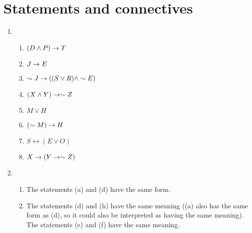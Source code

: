 \section{Statements and connectives}

\solutions{}

\begin{enumerate}
  \item %
    \begin{enumerate}[(\alph*)]
      \item \((D \wedge P) \rightarrow T\)
      \item \(J \rightarrow E\)
      \item \(\sim J \rightarrow ((S \vee R) \wedge \sim E)\)
      \item \((X \wedge Y) \rightarrow \sim Z\)
      \item \(M \vee H\)
      \item \((\sim M) \rightarrow H\)
      \item \(S \leftrightarrow (E \vee O)\)
      \item \(X \rightarrow (Y \rightarrow \sim Z)\)
    \end{enumerate}

  \item %
    \begin{enumerate}[(\alph*)]
      \item The statements (a) and (d) have the same form.
      \item The statements (d) and (h) have the same meaning ((a) also has the same form as (d), so it could also be interpreted as having the same meaning). The statements (e) and (f) have the same meaning.
    \end{enumerate}
\end{enumerate}

